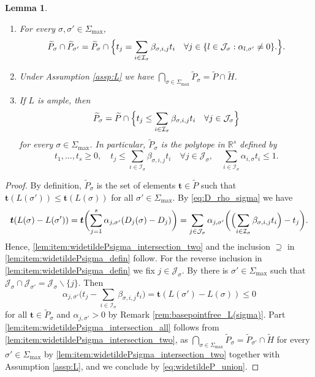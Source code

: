 \documentclass[11pt]{article}
\newcommand{\skpt}{\smallskip}
\numberwithin{equation}{section}
\newenvironment{enumeratei}
{\bgroup\def\theenumi{\roman{enumi}}\def\theenumii{\arabic{enumii}}\begin{enumerate}}
{\end{enumerate}\egroup}
\newcommand{\bft}{\boldsymbol{t}}
\newcommand\RR{\mathbb{R}}
\newcommand{\ii}[1]{\mathcal{J}_{#1}}
\newcommand{\ic}[1]{\mathcal{I}_{#1}}
\newtheorem{lemma}[theorem]{Lemma}
\theoremstyle{definition}
\numberwithin{theorem}{section}
\begin{document}
\pagebreak[2]
\skpt
\begin{lemma}
\label{lem:widetildePsigma}
\begin{enumeratei}
\item
\label{lem:item:widetildePsigma_intersection_two}
For every $\sigma, \sigma'\in\Sigma_{\max}$,
\[
\widetilde P_\sigma \cap \widetilde P_{\sigma'} =
\widetilde P_\sigma \cap
\Bigl \{
t_{j}
= \sum_{i\in\ic{\sigma}} \beta_{\sigma, i, j}t_i
\quad \forall j\in \{l\in \ii{\sigma} : \alpha_{l, \sigma'}\neq0\}.
\Bigr \}.
\]
\item
\label{lem:item:widetildePsigma_intersection_all}
Under Assumption \ref{assp:L} we have
$\bigcap_{\sigma\in\Sigma_{\max}} \widetilde P_{\sigma} =\widetilde P \cap \widetilde H$.
\item
\label{lem:item:widetildePsigma_defin}
If $L$ is ample, then
\[
\widetilde P_\sigma
= \widetilde P \cap
\Bigl \{
t_{j}
\leq \sum_{i\in\ic{\sigma}} \beta_{\sigma, i, j}t_i
\quad \forall j\in\ii{\sigma}
\Bigr \}
\]
for every $\sigma\in\Sigma_{\max}$.
In particular, $\widetilde P_\sigma$
is the polytope in $\RR^{s}$ defined by
\[
t_1,\dots,t_s \geq0, \quad
t_{j}
\leq \sum_{i\in\ic{\sigma}} \beta_{\sigma, i,j}t_i
\quad \forall j\in\ii{\sigma}, \quad
\sum_{i\in\ic{\sigma}} \alpha_{i,\sigma}t_i \leq 1.
\]
\end{enumeratei}
\end{lemma}
\begin{proof}
By definition, $\widetilde P_{\sigma}$ is the set of elements $\bft\in \widetilde P$
such that $\bft(L(\sigma'))\leq \bft(L(\sigma))$
for all $\sigma'\in\Sigma_{\max}$. By \eqref{eq:D_rho_sigma} we have
\begin{equation*}
\bft (L(\sigma) - L(\sigma'))
= \bft \biggl(\sum_{j=1}^s \alpha_{j,\sigma'} (D_j(\sigma) - D_j) \biggr)
= \sum_{j\in \ii{\sigma}} \alpha_{j,\sigma'}
\biggl (\Bigl(
\sum_{i\in\ic{\sigma}}\beta_{\sigma,i,j} t_i
\Bigr) - {t_j} \biggr).
\end{equation*}
Hence, \eqref{lem:item:widetildePsigma_intersection_two} and
the inclusion $\supseteq$ in \eqref{lem:item:widetildePsigma_defin} follow.
For the reverse inclusion in \eqref{lem:item:widetildePsigma_defin} we fix $j\in\ii{\sigma}$.
By \cite[Lem.\,8.9]{MR1679841}
there is
$\sigma'\in\Sigma_{\max}$ such that
$\ii{\sigma}\cap\ii{\sigma'}=\ii{\sigma}\smallsetminus\{j\}$.
Then
\[
\alpha_{j,\sigma'}
\biggl(
{t_j}
-\sum_{i\in\ic{\sigma}}\beta_{\sigma,i,j} t_i
\biggr) = \bft (L(\sigma') - L(\sigma)) \leq 0
\]
for all $\bft\in\widetilde P_\sigma$ and $\alpha_{j,\sigma'}>0$
by Remark \ref{rem:basepointfree_L(sigma)}.
Part \eqref{lem:item:widetildePsigma_intersection_all} follows
from \eqref{lem:item:widetildePsigma_intersection_two},
as $\bigcap_{\sigma\in\Sigma_{\max}} \widetilde P_{\sigma} =\widetilde P_{\sigma'} \cap \widetilde H$
for every $\sigma'\in\Sigma_{\max}$ by \eqref{lem:item:widetildePsigma_intersection_two}
together with Assumption \ref{assp:L}, and we conclude by \eqref{eq:widetildeP_union}.
\end{proof}
\end{document}
